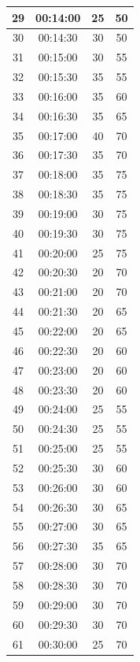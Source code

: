 \documentclass[a4paper,12pt]{article}
\begin{document}
\begin{longtable}{|c|c|c|c|}
    29 & 00:14:00 & 25 & 50 \\ \hline
    30 & 00:14:30 & 30 & 50 \\ \hline
    31 & 00:15:00 & 30 & 55 \\ \hline
    32 & 00:15:30 & 35 & 55 \\ \hline
    33 & 00:16:00 & 35 & 60 \\ \hline
    34 & 00:16:30 & 35 & 65 \\ \hline
    35 & 00:17:00 & 40 & 70 \\ \hline
    36 & 00:17:30 & 35 & 70 \\ \hline
    37 & 00:18:00 & 35 & 75 \\ \hline
    38 & 00:18:30 & 35 & 75 \\ \hline
    39 & 00:19:00 & 30 & 75 \\ \hline
    40 & 00:19:30 & 30 & 75 \\ \hline
    41 & 00:20:00 & 25 & 75 \\ \hline
    42 & 00:20:30 & 20 & 70 \\ \hline
    43 & 00:21:00 & 20 & 70 \\ \hline
    44 & 00:21:30 & 20 & 65 \\ \hline
    45 & 00:22:00 & 20 & 65 \\ \hline
    46 & 00:22:30 & 20 & 60 \\ \hline
    47 & 00:23:00 & 20 & 60 \\ \hline
    48 & 00:23:30 & 20 & 60 \\ \hline
    49 & 00:24:00 & 25 & 55 \\ \hline
    50 & 00:24:30 & 25 & 55 \\ \hline
    51 & 00:25:00 & 25 & 55 \\ \hline
    52 & 00:25:30 & 30 & 60 \\ \hline
    53 & 00:26:00 & 30 & 60 \\ \hline
    54 & 00:26:30 & 30 & 65 \\ \hline
    55 & 00:27:00 & 30 & 65 \\ \hline
    56 & 00:27:30 & 35 & 65 \\ \hline
    57 & 00:28:00 & 30 & 70 \\ \hline
    58 & 00:28:30 & 30 & 70 \\ \hline
    59 & 00:29:00 & 30 & 70 \\ \hline
    60 & 00:29:30 & 30 & 70 \\ \hline
    61 & 00:30:00 & 25 & 70 \\ \hline
\end{longtable}
\end{document}
